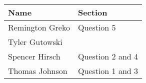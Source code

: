 \documentclass{article}
\begin{document}
\pagebreak

\begin{center}
    \begin{tabular}{|p{3cm}|p{6cm}|}
        \hline
        \textbf{Name} & \textbf{Section} \\
        \hline
        Remington Greko &  Question 5\\
        \hline
        Tyler Gutowski &  \\
        \hline
        Spencer Hirsch &  Question 2 and 4\\
        \hline
        Thomas Johnson &  Question 1 and 3\\
        \hline
    \end{tabular}
\end{center}
\end{document}
